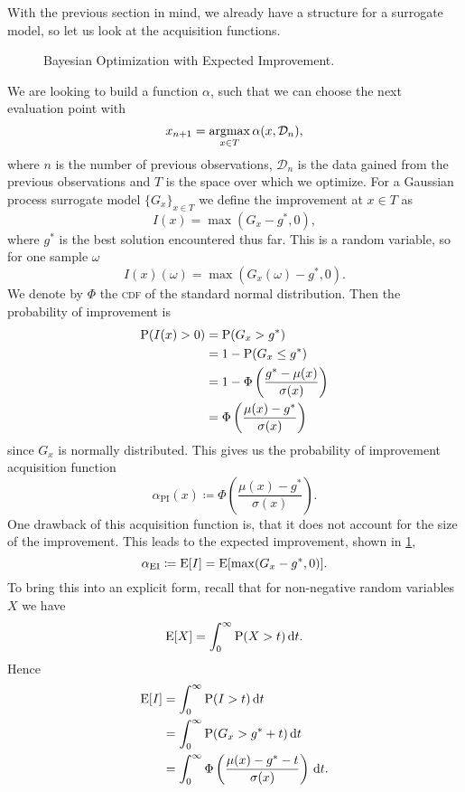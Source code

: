 With the previous section in mind, we already have a structure for a surrogate model, so let us look at the acquisition functions.
\begin{figure}[t]
    \centering
    
    \caption{Bayesian Optimization with Expected Improvement.}
    \label{fig:bayes_opt_ei}
\end{figure}
We are looking to build a function $\alpha$, such that we can choose the next evaluation point with
\[
    x_{n+1} = \argmax_{x \in T} \alpha(x,\mathcal{D}_{n}),
\]
where $n$ is the number of previous observations, $\mathcal{D}_{n}$ is the data gained from the previous observations and $T$ is the space over which we optimize.
For a Gaussian process surrogate model $\{ G_{x} \}_{x \in T}$ we define the improvement at $x \in T$ as
\[
    I(x) = \max(G_{x}-g^{*},0),
\]
where $g^{*}$ is the best solution encountered thus far.
This is a random variable, so for one sample $\omega$
\[
    I(x)(\omega) = \max(G_{x}(\omega)-g^{*},0).
\]
We denote by $\Phi$ the \textsc{cdf} of the standard normal distribution.
Then the probability of improvement is
\begin{align*}
    \Prob(I(x) > 0) &= \Prob(G_{x} > g^{*})\\
    &= 1- \Prob(G_{x}\leq g^{*})\\
    &= 1-  \Phi\left(\frac{g^{*}-\mu(x)}{\sigma(x)}\right)\\
    &=\Phi\left(\frac{\mu(x)-g^{*}}{\sigma(x)}\right)
\end{align*}
since $G_{x}$ is normally distributed.
This gives us the probability of improvement acquisition function
\[
    \alpha_{\operatorname{PI}}(x) \coloneqq \Phi\left(\frac{\mu(x)-g^{*}}{\sigma(x)}\right).
\]
One drawback of this acquisition function is, that it does not account for the size of the improvement.
This leads to the expected improvement, shown in \cref{fig:bayes_opt_ei},
\[
    \alpha_{\operatorname{EI}} \coloneqq \E[I] = \E[\max(G_{x}-g^{*},0)].
\]
To bring this into an explicit form, recall that for non-negative random variables $X$ we have
\[
    \E[X] = \int_{0}^{\infty} \Prob(X > t) \dx[t].
\]
Hence
\begin{align*}
    \E[I] &= \int_{0}^{\infty} \Prob(I > t) \dx[t]\\
    &= \int_{0}^{\infty} \Prob(G_{x}> g^{*}+t) \dx[t]\\
    &= \int_{0}^{\infty} \Phi \left( \frac{\mu(x)-g^{*}-t}{\sigma(x)} \right) \dx[t].
\end{align*}
